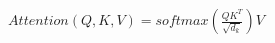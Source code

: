 \documentclass[preview]{standalone}
\begin{document}
\begin{align*}
Attention(Q, K, V) = softmax(\frac{QK^T}{\sqrt{d_k}})V
\end{align*}
\end{document}
